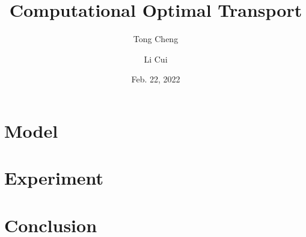 \documentclass[a4paper, 12pt]{article}
\title{Computational Optimal Transport}
\author{
    Tong Cheng \\ \bnu
    \and
    Li Cui \\ \bnu
}
\date{Feb. 22, 2022}
\begin{document}
\maketitle
\begin{abstract}
    \lipsum[1]
\end{abstract}





\section{Model}
    \lipsum[4]

\section{Experiment}
    \lipsum[5]




\section{Conclusion}
    \lipsum[7]



\end{document}

